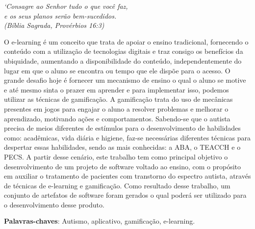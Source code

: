 \begin{epigrafe}
    \vspace*{\fill}
	\begin{flushright}
		\textit{`Consagre ao Senhor tudo o que você faz,\\
			e os seus planos serão bem-sucedidos. \\
		(Bíblia Sagrada, Provérbios 16:3)}
	\end{flushright}
\end{epigrafe}


\setlength{\absparsep}{18pt} %
\begin{resumo}
O e-learning é um conceito que trata de apoiar o ensino tradicional, fornecendo o conteúdo com a utilização de tecnologias digitais e traz consigo os benefícios da ubiquidade, aumentando a disponibilidade do conteúdo, independentemente do lugar em que o aluno se encontra ou tempo que ele dispõe para o acesso. O grande desafio hoje é fornecer um mecanismo de ensino o qual o aluno se motive e até mesmo sinta o prazer em aprender e para implementar isso, podemos utilizar as técnicas de gamificação. A gamificação trata do uso de mecânicas presentes em jogos para engajar o aluno a resolver problemas e melhorar o aprendizado, motivando ações e comportamentos. Sabendo-se que o autista precisa de meios diferentes de estímulos para o desenvolvimento de habilidades como: acadêmicas, vida diária e higiene, faz-se necessárias diferentes técnicas para despertar essas habilidades, sendo as mais conhecidas: a ABA, o TEACCH e o PECS. A partir desse cenário, este trabalho tem como principal objetivo o desenvolvimento de um projeto de software voltado ao ensino, com o propósito em auxiliar o tratamento de pacientes com transtorno do espectro autista, através de técnicas de e-learning e gamificação. Como resultado desse trabalho, um conjunto de artefatos de software foram gerados o qual poderá ser utilizado para o desenvolvimento desse produto.

 \textbf{Palavras-chaves}: Autismo, aplicativo, gamificação, e-learning.
 
\end{resumo}

